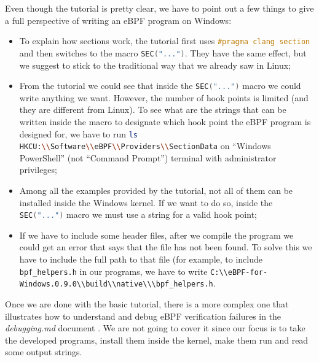 Even though the tutorial is pretty clear, we have to point out a few things to give a full perspective of writing an eBPF program on Windows:

\begin{itemize}
	\item 
		To explain how sections work, the tutorial first uses \colorbox{backcolour}{\lstinline[style=cstyle, language=C]|#pragma clang section|} and then switches to the macro \colorbox{backcolour}{\lstinline[style=cstyle, language=C]|SEC("...")|}.
		They have the same effect, but we suggest to stick to the traditional way that we already saw in Linux; 
	\item 
		From the tutorial we could see that inside the \colorbox{backcolour}{\lstinline[style=cstyle, language=C]|SEC("...")|} macro we could write anything we want.
		However, the number of hook points is limited (and they are different from Linux).
		To see what are the strings that can be written inside the macro to designate which hook point the eBPF program is designed for, we have to run \colorbox{backcolour}{\lstinline[style=commandline, language=bash]|ls HKCU:\\Software\\eBPF\\Providers\\SectionData|} on ``Windows PowerShell'' (not ``Command Prompt'') terminal with administrator privileges;
	\item 
		Among all the examples provided by the tutorial, not all of them can be installed inside the Windows kernel.
		If we want to do so, inside the \colorbox{backcolour}{\lstinline[style=cstyle, language=C]|SEC("...")|} macro we must use a string for a valid hook point;
	\item 
		If we have to include some header files, after we compile the program we could get an error that says that the file has not been found.
		To solve this we have to include the full path to that file (for example, to include \colorbox{backcolour}{\lstinline[style=commandline, language=bash]|bpf_helpers.h|} in our programs, we have to write \colorbox{backcolour}{\lstinline[style=commandline, language=bash]|C:\\eBPF-for-Windows.0.9.0\\build\\native\\\bpf_helpers.h|}.
\end{itemize}

Once we are done with the basic tutorial, there is a more complex one that illustrates how to understand and debug eBPF verification failures in the \textit{debugging.md} document \cite{DebugDoc}.
We are not going to cover it since our focus is to take the developed programs, install them inside the kernel, make them run and read some output strings.

